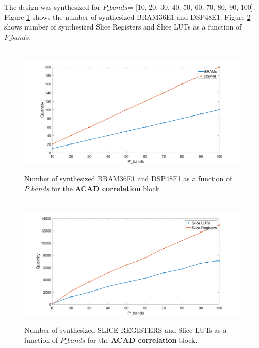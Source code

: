 The design was synthesized for $P\_bands$= [10, 20, 30, 40, 50, 60, 70, 80, 90, 100]. Figure \ref{fig:primitves_correlation}  shows the number of synthesized BRAM36E1 and DSP48E1. Figure \ref{fig:luts_and_regs_corr} shows number of synthesized Slice Registers and Slice LUTs as a function of $P\_bands$.

\begin{figure}[H]

\hbox{\hspace*{-2cm}                                                           
   \includegraphics[scale=0.3]{images/number_of_BRAMS_and_DSP48_correlation_module.png}}
  \caption{Number of synthesized BRAM36E1 and DSP48E1 as a function of $P\_bands$ for the \textbf{ACAD correlation} block.  } 
  \label{fig:primitves_correlation}
\end{figure}


\begin{figure}[H]

\hbox{\hspace*{-2cm}                                                           
   \includegraphics[scale=0.3]{images/correlation_luts_and_registers.png}}
  \caption{Number of synthesized SLICE REGISTERS and Slice LUTs as a function of $P\_bands$ for the \textbf{ACAD correlation} block. } 
  \label{fig:luts_and_regs_corr}
\end{figure}

